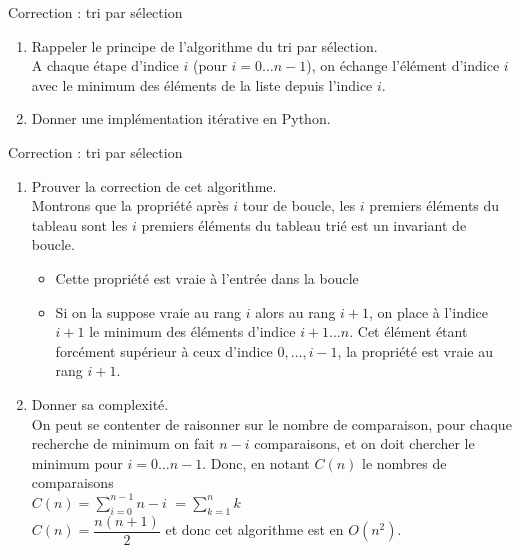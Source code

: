 \documentclass[10pt]{beamer}
\begin{document}
\begin{frame}[fragile]{\Ctitle}{\stitle}
	\begin{exampleblock}{Correction : tri par sélection}
		\begin{enumerate}
			\item<1-> Rappeler le principe de l'algorithme du tri par sélection.\\
				\onslide<2->\textcolor{OliveGreen}{\small A chaque étape d'indice $i$ (pour $i= 0 \dots n-1$), on échange l'élément d'indice $i$ avec le minimum des éléments de la liste depuis l'indice $i$.}
			\item<3-> Donner une implémentation itérative en Python.
		\end{enumerate}
	\end{exampleblock}
\end{frame}

\begin{frame}[fragile]{\Ctitle}{\stitle}
	\begin{exampleblock}{Correction : tri par sélection}
		\begin{enumerate}
			\addtocounter{enumi}{2}
			\item<1-> Prouver la correction de cet algorithme.\\
				\onslide<2->\textcolor{OliveGreen}{\small Montrons que la propriété \og{} après $i$ tour de boucle, les $i$ premiers éléments du tableau sont les $i$ premiers éléments du tableau trié \fg{} est un invariant de boucle.}
				\begin{itemize}
					\item<3-> \textcolor{OliveGreen}{Cette propriété est vraie à l'entrée dans la boucle}
					\item<4-> \textcolor{OliveGreen}{Si on la suppose vraie au rang $i$ alors au rang $i+1$, on place à l'indice $i+1$ le minimum des éléments d'indice $i+1 \dots n$. Cet élément étant forcément supérieur à ceux d'indice $0,\dots, i-1$, la propriété est vraie au rang $i+1$.}
				\end{itemize}
			\item<5-> Donner sa complexité. \\
				\onslide<6->\textcolor{OliveGreen}{\small On peut se contenter de raisonner sur le nombre de comparaison, pour chaque recherche de minimum on fait $n-i$ comparaisons, et on doit chercher le minimum pour $i=0 \dots n-1$. Donc, en notant $C(n)$ le nombres de comparaisons \\}
				\onslide<7->\textcolor{OliveGreen}{$C(n)=\displaystyle{\sum_{i=0}^{n-1} n-i}$}
				\onslide<8->\textcolor{OliveGreen}{$=\displaystyle{\sum_{k=1}^{n} k}$\\}
				\onslide<9->\textcolor{OliveGreen}{$C(n)=\dfrac{n(n+1)}{2}$ et donc cet algorithme est en $O(n^2)$.}
		\end{enumerate}
	\end{exampleblock}
\end{frame}
\end{document}

